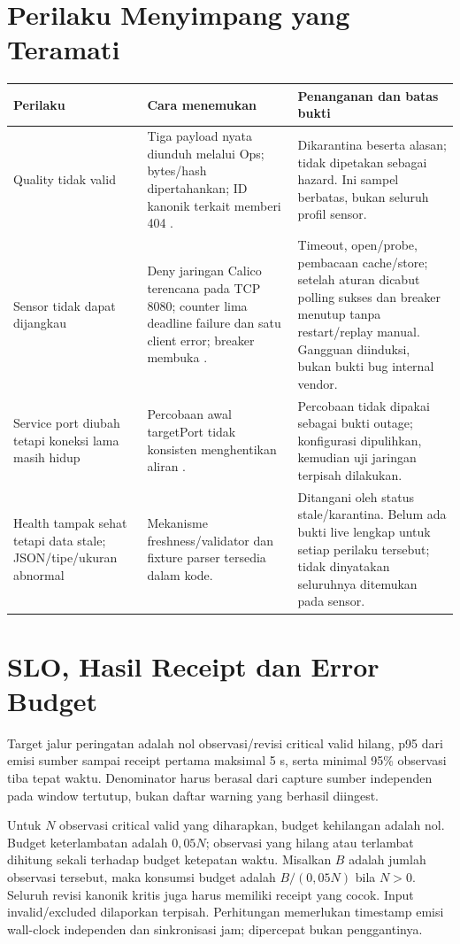 \section{Perilaku Menyimpang yang Teramati}
\begin{longtable}{@{}P{3.8cm}P{5.6cm}P{6.1cm}@{}}
\toprule Perilaku & Cara menemukan & Penanganan dan batas bukti\\\midrule\endhead
Quality tidak valid & Tiga payload nyata diunduh melalui Ops; bytes/hash dipertahankan; ID kanonik terkait memberi 404 . & Dikarantina beserta alasan; tidak dipetakan sebagai hazard. Ini sampel berbatas, bukan seluruh profil sensor.\\
Sensor tidak dapat dijangkau & Deny jaringan Calico terencana pada TCP 8080; counter lima deadline failure dan satu client error; breaker membuka . & Timeout, open/probe, pembacaan cache/store; setelah aturan dicabut polling sukses dan breaker menutup tanpa restart/replay manual. Gangguan diinduksi, bukan bukti bug internal vendor.\\
Service port diubah tetapi koneksi lama masih hidup & Percobaan awal targetPort tidak konsisten menghentikan aliran . & Percobaan tidak dipakai sebagai bukti outage; konfigurasi dipulihkan, kemudian uji jaringan terpisah dilakukan.\\
Health tampak sehat tetapi data stale; JSON/tipe/ukuran abnormal & Mekanisme freshness/validator dan fixture parser tersedia dalam kode. & Ditangani oleh status stale/karantina. Belum ada bukti live lengkap untuk setiap perilaku tersebut; tidak dinyatakan seluruhnya ditemukan pada sensor.\\\bottomrule
\end{longtable}

\section{SLO, Hasil Receipt dan Error Budget}
Target jalur peringatan adalah nol observasi/revisi critical valid hilang, p95 dari emisi sumber sampai receipt pertama maksimal 5 s, serta minimal 95\% observasi tiba tepat waktu. Denominator harus berasal dari capture sumber independen pada window tertutup, bukan daftar warning yang berhasil diingest.

Untuk $N$ observasi critical valid yang diharapkan, budget kehilangan adalah nol. Budget keterlambatan adalah $0{,}05N$; observasi yang hilang atau terlambat dihitung sekali terhadap budget ketepatan waktu. Misalkan $B$ adalah jumlah observasi tersebut, maka konsumsi budget adalah $B/(0{,}05N)$ bila $N>0$. Seluruh revisi kanonik kritis juga harus memiliki receipt yang cocok. Input invalid/excluded dilaporkan terpisah. Perhitungan memerlukan timestamp emisi wall-clock independen dan sinkronisasi jam;  dipercepat bukan penggantinya.

